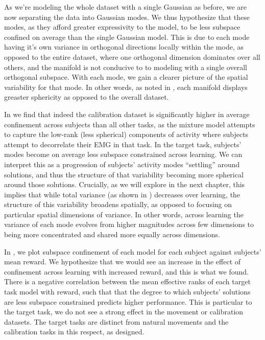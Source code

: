 \documentclass[../main.tex]{subfiles}
\begin{document}
As we're modeling the whole dataset with a single Gaussian as before, we are now separating the data into Gaussian modes. We thus hypothesize that these modes, as they afford greater expressivity to the model, to be less subspace confined on average than the single Gaussian model. This is due to each mode having it's own variance in orthogonal directions locally within the mode, as opposed to the entire dataset, where one orthogonal dimension dominates over all others, and the manifold is not conducive to to modeling with a single overall orthogonal subspace. With each mode, we gain a clearer picture of the spatial variability for that mode. In other words, as noted in , each manifold displays greaster sphericity as opposed to the overall dataset.


In  we find that indeed the calibration dataset is significantly higher in average confinement across subjects than all other tasks, as the mixture model attempts to capture the low-rank (less spherical) components of activity where subjects attempt to decorrelate their EMG in that task. In the target task, subjects' modes become on average less subspace constrained across learning. We can interpret this as a progression of subjects' activity modes ``settling'' around solutions, and thus the structure of that variability becoming more spherical around those solutions. Crucially, as we will explore in the next chapter, this implies that while total variance (as shown in ) decreases over learning, the structure of this variability broadens spatially, as opposed to focusing on particular spatial dimensions of variance. In other words, across learning the variance of each mode evolves from higher magnitudes across few dimensions to being more concentrated and shared more equally across dimensions.


In , we plot subspace confinement of each model for each subject against subjects' mean reward. We hypothesize that we would see an increase in the effect of confinement across learning with increased reward, and this is what we found. There is a negative correlation between the mean effective ranks of each target task model with reward, such that that the degree to which subjects' solutions are less subspace constrained predicts higher performance. This is particular to the target task, we do not see a strong effect in the movement or calibration datasets. The target tasks are distinct from natural movements and the calibration tasks in this respect, as designed.
\end{document}
